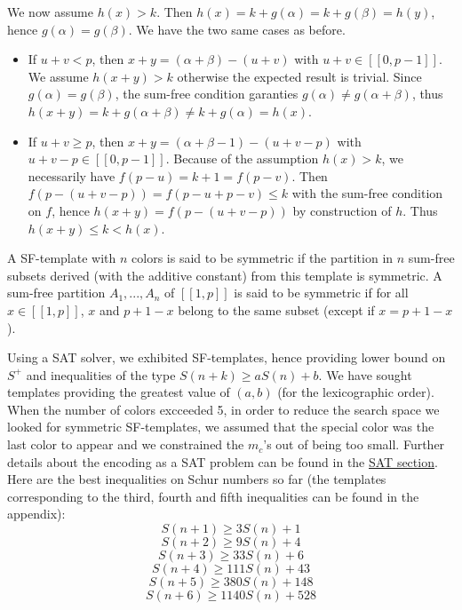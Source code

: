 We now assume \(h(x) > k\). Then \(h(x) = k + g(\alpha) = k + g(\beta) = h(y)\), hence \(g(\alpha) = g(\beta)\). 
We have the two same cases as before.

\begin{itemize}
\item If \(u+v < p\), then \(x+y = (\alpha+\beta) - (u+v) \) with \(u+v \in [\![0,p-1]\!] \).
We assume \(h(x+y) > k\) otherwise the expected result is trivial.
Since \(g(\alpha) = g(\beta)\), the sum-free condition garanties \(g(\alpha) \neq g(\alpha+\beta)\), 
thus \(h(x+y) = k + g(\alpha + \beta) \neq k + g(\alpha) = h(x)\).
\item If \(u+v \geqslant p\), then \(x+y = (\alpha+\beta-1) - (u+v-p) \) with \(u+v-p \in [\![0,p-1]\!] \).
Because of the assumption \(h(x) > k\), we necessarily have \(f(p-u) = k+1 = f(p-v)\). 
Then \(f(p-(u+v-p)) = f(p-u + p-v) \leqslant k \) with the sum-free condition on \(f\), 
hence \(h(x+y) = f(p-(u+v-p)) \) by construction of \(h\). Thus \(h(x+y) \leqslant k < h(x)\).
\end{itemize}

\begin{definition}
A SF-template with \(n\) colors is said to be symmetric if the partition in \(n\) sum-free subsets derived (with the additive constant) from this template is symmetric. 
A sum-free partition \(A_1, ..., A_n\) of \([\![1, p]\!]\) is said to be symmetric if for all \( x \in [\![1, p]\!]\), \(x\) and \(p + 1 - x\) belong to the same subset 
(except if \(x = p + 1 - x\)).
\end{definition}

Using a SAT solver, we exhibited SF-templates, hence providing lower bound on \(S^+\) and inequalities 
of the type \(S(n+k) \geqslant a S(n) + b\). We have sought templates providing the greatest value of 
\((a, b)\) (for the lexicographic order). When the number of colors excceeded 5, in order to reduce the search space we 
looked for symmetric SF-templates, we assumed that the special color was the last color to appear and we constrained 
the \(m_c\)'s out of being too small. Further details about the encoding as a SAT problem can be found in the
\hyperref[SAT]{SAT section}. \\

Here are the best inequalities on Schur numbers so far (the templates corresponding to the third, fourth and fifth 
inequalities can be found in the appendix):
\[ S(n+1) \geqslant 3S(n) + 1 \]
\[ S(n+2) \geqslant 9S(n) + 4 \]
\[ S(n+3) \geqslant 33S(n) + 6 \]
\[ S(n+4) \geqslant 111S(n) + 43 \]
\[ S(n+5) \geqslant 380S(n) + 148 \]
\[ S(n+6) \geqslant 1140S(n) + 528 \]


